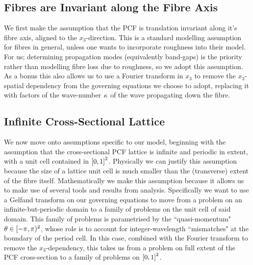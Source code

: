 \subsection{Fibres are Invariant along the Fibre Axis} \label{sec:ModellingAssumption1}
We first make the assumption that the PCF is translation invariant along it's fibre axis, aligned to the $x_3$-direction.
This is a standard modelling assumption for fibres in general, unless one wants to incorporate roughness into their model.
For us; determining propagation modes (equivalently band-gaps) is the priority rather than modelling fibre loss due to roughness, so we adopt this assumption.
As a bonus this also allows us to use a Fourier transform in $x_3$ to remove the $x_3$-spatial dependency from the governing equations we choose to adopt, replacing it with factors of the wave-number $\kappa$ of the wave propagating down the fibre.

\subsection{Infinite Cross-Sectional Lattice} \label{sec:ModellingAssumption2}
We now move onto assumptions specific to our model, beginning with the assumption that the cross-sectional PCF lattice is infinite and periodic in extent, with a unit cell contained in $\left[ 0,1 \right]^2$.
Physically we can justify this assumption because the size of a lattice unit cell is much smaller than the (transverse) extent of the fibre itself.
Mathematically we make this assumption because it allows us to make use of several tools and results from analysis.
Specifically we want to use a Gelfand transform on our governing equations to move from a problem on an infinite-but-periodic domain to a family of problems on the unit cell of said domain.
This family of problems is parametrised by the ``quasi-momentum" $\theta\in[-\pi,\pi)^2$, whose role is to account for integer-wavelength ``mismatches" at the boundary of the period cell.
In this case, combined with the Fourier transform to remove the $x_3$-dependency, this takes us from a problem on full extent of the PCF cross-section to a family of problems on $\left[ 0,1 \right]^2$.

